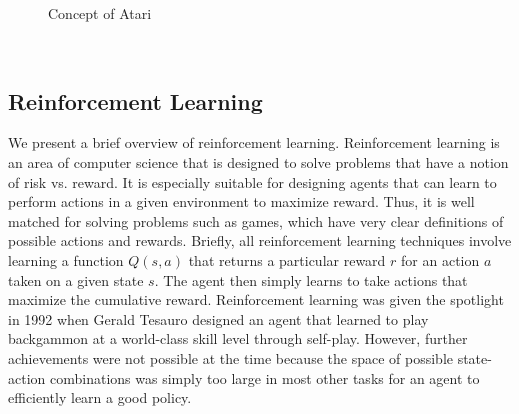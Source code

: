 \begin{figure}[h]
	\centering
	\hfill
	\caption{Concept of Atari}
	\label{fig:atari}
\end{figure}
\\

\subsection{Reinforcement Learning}
We present a brief overview of reinforcement learning. Reinforcement learning is an area of computer science that is designed to solve problems that have a notion of risk vs. reward. It is especially suitable for designing agents that can learn to perform actions in a given environment to maximize reward. Thus, it is well matched for solving problems such as games, which have very clear definitions of possible actions and rewards. Briefly, all reinforcement learning techniques involve learning a function $Q(s,a)$ that returns a particular reward $r$ for an action $a$ taken on a given state $s$. The agent then simply learns to take actions that maximize the cumulative reward. Reinforcement learning was given the spotlight in 1992 when Gerald Tesauro designed an agent that learned to play backgammon at a world-class skill level through self-play. However, further achievements were not possible at the time because the space of possible state-action combinations was simply too large in most other tasks for an agent to efficiently learn a good policy.

